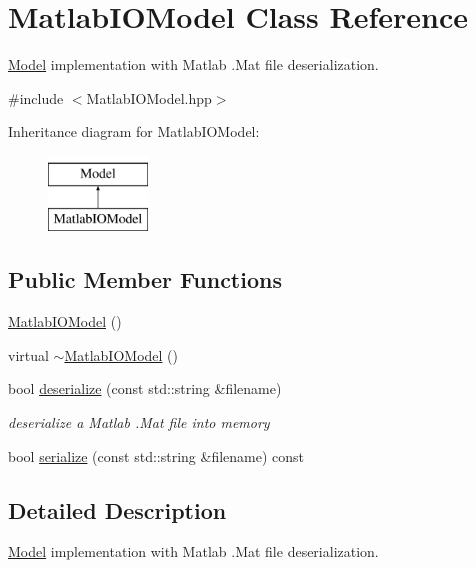 \hypertarget{classMatlabIOModel}{\section{\-Matlab\-I\-O\-Model \-Class \-Reference}
\label{classMatlabIOModel}
}


\hyperlink{classModel}{\-Model} implementation with \-Matlab .\-Mat file deserialization.  




{\ttfamily \#include $<$\-Matlab\-I\-O\-Model.\-hpp$>$}

\-Inheritance diagram for \-Matlab\-I\-O\-Model\-:\begin{figure}[H]
\begin{center}
\leavevmode
\includegraphics[height=2.000000cm]{classMatlabIOModel}
\end{center}
\end{figure}
\subsection*{\-Public \-Member \-Functions}
\begin{DoxyCompactItemize}
\item 
\hyperlink{classMatlabIOModel_ac4e387c6665a094f985b0ca0c37b1aee}{\-Matlab\-I\-O\-Model} ()
\item 
virtual \hyperlink{classMatlabIOModel_ac47ddec68b26241297c266b248c856d6}{$\sim$\-Matlab\-I\-O\-Model} ()
\item 
bool \hyperlink{classMatlabIOModel_a223538821bf7944a26433f7f99017f8b}{deserialize} (const std\-::string \&filename)
\begin{DoxyCompactList}\small\item\em deserialize a \-Matlab .\-Mat file into memory \end{DoxyCompactList}\item 
bool \hyperlink{classMatlabIOModel_ad67a1237af4a4e4d736599e6f2474252}{serialize} (const std\-::string \&filename) const 
\end{DoxyCompactItemize}


\subsection{\-Detailed \-Description}
\hyperlink{classModel}{\-Model} implementation with \-Matlab .\-Mat file deserialization. 

